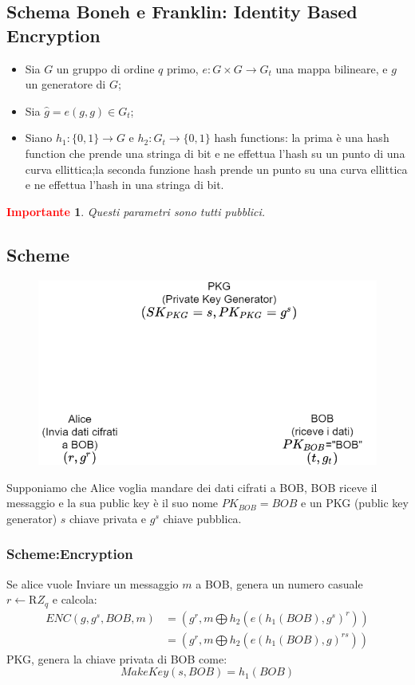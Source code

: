 \documentclass{book}
\newtheorem*{Importante}{\textbf{\textcolor{red}{Importante}}}
\begin{document}
\subsection{Schema Boneh e Franklin: Identity Based Encryption}
\begin{itemize}
	\item Sia \(G\) un gruppo di ordine \(q\) primo, \(e:G\times G\rightarrow G_{t}\) una mappa bilineare, e \(g\) un generatore di \(G\);
	\item Sia \(\hat{g}=e(g,g)\in G_{t}\);
	\item Siano \(h_{1}:\{0,1\}\rightarrow G\) e \(h_{2}:G_{t}\rightarrow \{0,1\} \) hash functions: la prima è una hash function che prende una stringa di bit e ne effettua l'hash su un punto di una curva ellittica;la seconda funzione hash prende un punto su una curva ellittica e ne effettua l'hash in una stringa di bit.
\end{itemize}
\begin{Importante}
	Questi parametri sono tutti pubblici.
\end{Importante}\newpage
\subsection{Scheme}
\setlength\intextsep{0pt}
\begin{figure}
	\centering
	\includegraphics[scale=0.25]{ibes.png}
\end{figure}
Supponiamo che Alice voglia mandare dei dati cifrati a BOB, BOB riceve il messaggio e la sua public key è il suo nome \(PK_{BOB}=BOB\) e un PKG (public key generator) \(s\) chiave privata e \(g^{s}\) chiave pubblica.
\subsubsection{Scheme:Encryption}
Se alice vuole Inviare un messaggio \(m\) a BOB, genera un numero casuale \(r\leftarrow{\text{R}}Z_{q}\) e calcola:
\begin{align*}
	ENC(g,g^{s},BOB,m)&=
	(g^{r},m\bigoplus h_{2}({e(h_{1}(BOB),g^{s})}^{r}))\\
	&=(g^{r},m\bigoplus h_{2}({e(h_{1}(BOB),g)}^{rs}))
\end{align*}
PKG, genera la chiave privata di BOB come:\begin{equation*}
	MakeKey(s,BOB)=h_{1}(BOB)
\end{equation*}
\end{document}

